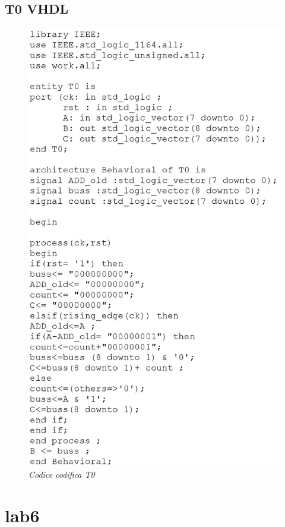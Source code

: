 \subsection{T0 VHDL}
\begin{figure}[!htb]
	\centering
	\includegraphics[scale=0.25]{immagini/t0}
	\caption{\textit{Codice codifica T0}}
	\label{t0}
\end{figure}
\newpage
\section{lab6}
